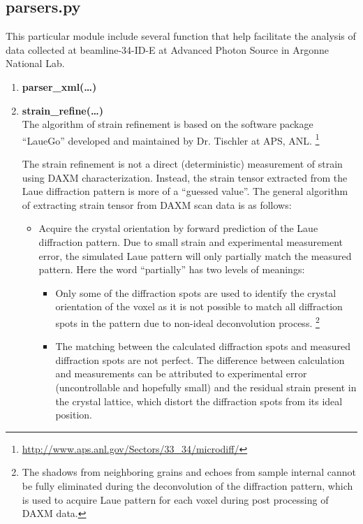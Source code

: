 \documentclass[12pt]{scrartcl}
\begin{document}
\subsection{parsers.py}
This particular module include several function that help facilitate the analysis of data collected at beamline-34-ID-E at Advanced Photon Source in Argonne National Lab.
%
\begin{enumerate}

\item \textbf{parser\_xml(\ldots)} \\

\item \textbf{strain\_refine(\ldots)} \\
The algorithm of strain refinement is based on the software package ``LaueGo'' developed and maintained by Dr. Tischler at APS, ANL.
\footnote{\url{http://www.aps.anl.gov/Sectors/33_34/microdiff/}}

The strain refinement is not a direct (deterministic) measurement of strain using DAXM characterization.
Instead, the strain tensor extracted from the Laue diffraction pattern is more of a ``guessed value''. 
The general algorithm of extracting strain tensor from DAXM scan data is as follows:
%
\begin{itemize}
\item 
Acquire the crystal orientation by forward prediction of the Laue diffraction pattern.
Due to small strain and experimental measurement error, the simulated Laue pattern will only partially match the measured pattern. 
Here the word ``partially'' has two levels of meanings:
	\begin{itemize}
	\item
	Only some of the diffraction spots are used to identify the crystal orientation of the voxel as it is not possible to match all diffraction spots in the pattern due to non-ideal deconvolution process.
\footnote{The shadows from neighboring grains and echoes from sample internal cannot be fully eliminated during the deconvolution of the diffraction pattern, which is used to acquire Laue pattern for each voxel during post processing of DAXM data.}
	\item
	The matching between the calculated diffraction spots and measured diffraction spots are not perfect. 
	The difference between calculation and measurements can be attributed to experimental error (uncontrollable and hopefully small) and the residual strain present in the crystal lattice, which distort the diffraction spots from its ideal position. 
	\end{itemize}
	

\end{itemize}
\end{enumerate}
\end{document}
